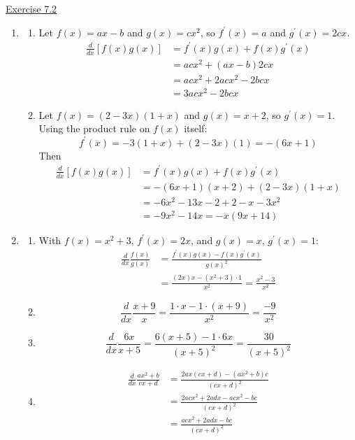 \underline{Exercise 7.2}
\begin{enumerate}
\item[3.]
\begin{enumerate}
\item[(d)] Let $f(x)=a x-b$ and $g(x)=c x^{2}$, so $f^{\prime}(x)=a$ and $g^{\prime}(x)=2 c x$.
\[
\begin{aligned}
\frac{d}{d x}\left[f(x) g(x)\right] &=f^{\prime}(x) g(x)+f(x) g^{\prime}(x) \\
&=a c x^{2}+(a x-b) 2 c x \\
&=a c x^{2}+2 a c x^{2}-2 b c x \\
&=3 a c x^{2}-2 b c x
\end{aligned}
\]
\item[(e)] Let $f(x)=(2-3 x)(1+x)$ and $g(x)=x+2$, so $g^{\prime}(x)=1$. Using the product rule on $f(x)$ itself:
\[ f^{\prime}(x)=-3(1+x)+(2-3 x)(1)=-(6 x+1) \]
Then
\[
\begin{aligned}
\frac{d}{d x}\left[f(x) g(x)\right] &=f^{\prime}(x) g(x)+f(x) g^{\prime}(x) \\
&=-(6 x+1)(x+2)+(2-3 x)(1+x) \\
&=-6 x^{2}-13 x-2+2-x-3 x^{2} \\
&=-9 x^{2}-14 x=-x(9 x+14)
\end{aligned}
\]
\end{enumerate}

\item[7.]
\begin{enumerate}
\item[(a)] With $f(x)=x^{2}+3$, $f^{\prime}(x)=2 x$, and $g(x)=x$, $g^{\prime}(x)=1$:
\[
\begin{aligned}
\frac{d}{d x} \frac{f(x)}{g(x)} &=\frac{f^{\prime}(x) g(x)-f(x) g^{\prime}(x)}{g(x)^{2}} \\
&=\frac{(2 x) x-\left(x^{2}+3\right) \cdot 1}{x^{2}}=\frac{x^{2}-3}{x^{2}}
\end{aligned}
\]
\item[(b)] \[ \frac{d}{d x} \frac{x+9}{x}=\frac{1 \cdot x-1 \cdot(x+9)}{x^{2}}=\frac{-9}{x^{2}} \]
\item[(c)] \[ \frac{d}{d x} \frac{6 x}{x+5}=\frac{6(x+5)-1 \cdot 6 x}{(x+5)^{2}}=\frac{30}{(x+5)^{2}} \]
\item[(d)]
\[
\begin{aligned}
\frac{d}{d x} \frac{a x^{2}+b}{c x+d} &=\frac{2 a x(c x+d)-\left(a x^{2}+b\right) c}{(c x+d)^{2}} \\
&=\frac{2 a c x^{2}+2 a d x-a c x^{2}-b c}{(c x+d)^{2}} \\
&=\frac{a c x^{2}+2 a d x-b c}{(c x+d)^{2}}
\end{aligned}
\]
\end{enumerate}


\end{enumerate}

